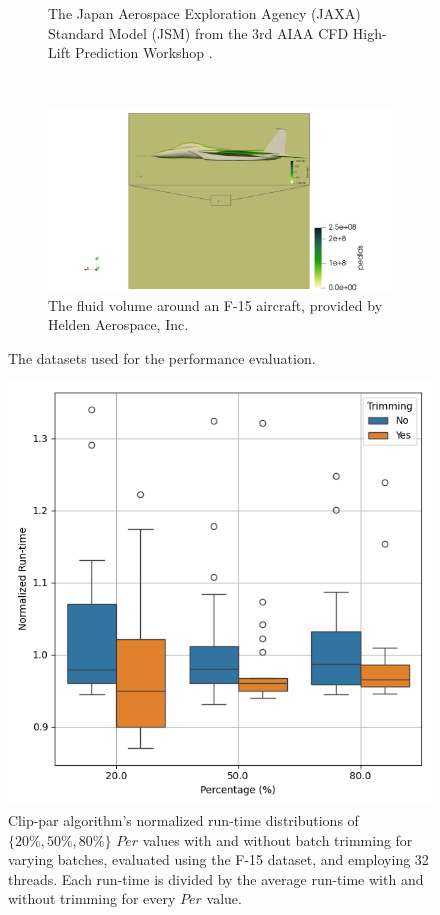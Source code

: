 \documentclass{egpubl}
\begin{document}
\begin{figure}[H]
\begin{subfigure}[t]{0.957\linewidth}
    \caption{The Japan Aerospace Exploration Agency (JAXA) Standard Model (JSM) from the 3rd AIAA CFD High-Lift Prediction Workshop \cite{JAXAModel}.}
  \end{subfigure}
  \\
  \begin{subfigure}[t]{0.957\linewidth}
    \centering
    \includegraphics[width=\linewidth]{Figures/F15.png}
    \caption{The fluid volume around an F-15 aircraft, provided by Helden Aerospace, Inc.}
  \end{subfigure}
  \caption{The datasets used for the performance evaluation.}
  \label{fig:datasets}
\end{figure}

\begin{figure}[H]
    \centering
    \includegraphics[width=\linewidth]{./Figures/Batch-Trimming.png}
    \caption{Clip-par algorithm's normalized run-time distributions of  $\{20\%, 50\%, 80\%\}$ $Per$ values with and without batch trimming for varying batches, evaluated using the F-15 dataset, and employing 32 threads. Each run-time is divided by the average run-time with and without trimming for every $Per$ value.}
    \label{fig:batch-trimming}
\end{figure}
\end{document}

